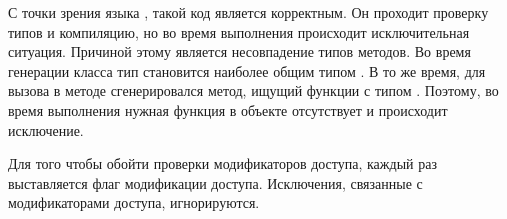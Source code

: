 С точки зрения языка , такой код является корректным. Он проходит проверку типов и компиляцию, но во время выполнения происходит исключительная ситуация. Причиной этому является несовпадение типов методов. Во время генерации класса  тип  становится наиболее общим типом . В то же время, для вызова в методе  сгенерировался метод, ищущий функции с типом . Поэтому, во время выполнения нужная функция в объекте  отсутствует и происходит исключение.

Для того чтобы обойти проверки модификаторов доступа, каждый раз выставляется флаг модификации доступа. Исключения, связанные с модификаторами доступа, игнорируются.
